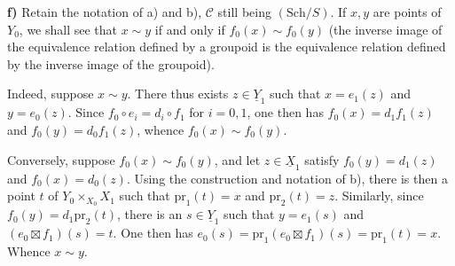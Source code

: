 \textbf{f)} Retain the notation of a) and b), $\mathcal C$ still being $(\mathrm{Sch}/S)$. If $x,y$ are points of $Y_0$, we shall see that $x\sim y$ if and only if $f_0(x)\sim f_0(y)$ (the inverse image of the equivalence relation defined by a groupoid is the equivalence relation defined by the inverse image of the groupoid).

Indeed, suppose $x\sim y$. There thus exists $z\in\underline Y_1$ such that $x=e_1(z)$ and $y=e_0(z)$. Since $f_0\circ e_i=d_i\circ f_1$ for $i=0,1$, one then has $f_0(x)=d_1f_1(z)$ and $f_0(y)=d_0f_1(z)$, whence $f_0(x)\sim f_0(y)$.

Conversely, suppose $f_0(x)\sim f_0(y)$, and let $z\in\underline X_1$ satisfy $f_0(y)=d_1(z)$ and $f_0(x)=d_0(z)$. Using the construction and notation of b), there is then a point $t$ of $Y_0\times_{X_0}X_1$ such that $\mathrm{pr}_1(t)=x$ and $\mathrm{pr}_2(t)=z$. Similarly, since $f_0(y)=d_1\mathrm{pr}_2(t)$, there is an $s\in\underline Y_1$ such that $y=e_1(s)$ and $(e_0\boxtimes f_1)(s)=t$. One then has $e_0(s)=\mathrm{pr}_1(e_0\boxtimes f_1)(s)=\mathrm{pr}_1(t)=x$. Whence $x\sim y$.

